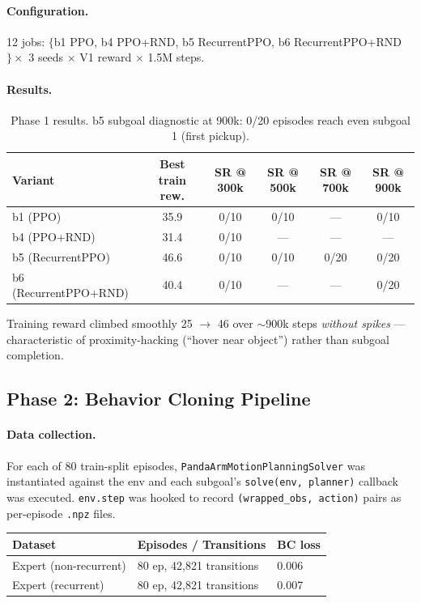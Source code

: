 \documentclass[11pt,letterpaper]{article}
\begin{document}
\paragraph{Configuration.}
12 jobs: $\{$b1 PPO, b4 PPO+RND, b5 RecurrentPPO, b6 RecurrentPPO+RND$\}
\times$ 3 seeds $\times$ V1 reward $\times$ 1.5M steps.

\paragraph{Results.}

\begin{table}[H]
\centering
\begin{tabular}{lccccc}
\toprule
\textbf{Variant} & \textbf{Best train rew.} & \textbf{SR @ 300k}
& \textbf{SR @ 500k} & \textbf{SR @ 700k} & \textbf{SR @ 900k} \\
\midrule
b1 (PPO) & 35.9 & 0/10 & 0/10 & — & 0/10 \\
b4 (PPO+RND) & 31.4 & 0/10 & — & — & — \\
b5 (RecurrentPPO) & 46.6 & 0/10 & 0/10 & 0/20 & 0/20 \\
b6 (RecurrentPPO+RND) & 40.4 & 0/10 & — & — & 0/20 \\
\bottomrule
\end{tabular}
\caption{Phase 1 results. b5 subgoal diagnostic at 900k: 0/20 episodes reach
even subgoal 1 (first pickup).}
\end{table}

Training reward climbed smoothly 25 $\to$ 46 over $\sim$900k steps \emph{without
spikes} — characteristic of proximity-hacking (``hover near object'') rather
than subgoal completion.

\subsection{Phase 2: Behavior Cloning Pipeline}

\paragraph{Data collection.}
For each of 80 train-split episodes, \texttt{PandaArmMotionPlanningSolver} was
instantiated against the env and each subgoal's \texttt{solve(env, planner)}
callback was executed. \texttt{env.step} was hooked to record
\texttt{(wrapped\_obs, action)} pairs as per-episode \texttt{.npz} files.

\begin{table}[H]
\centering
\begin{tabular}{lll}
\toprule
\textbf{Dataset} & \textbf{Episodes / Transitions} & \textbf{BC loss} \\
\midrule
Expert (non-recurrent) & 80 ep, 42{,}821 transitions & 0.006 \\
Expert (recurrent) & 80 ep, 42{,}821 transitions & 0.007 \\
\bottomrule
\end{tabular}
\end{table}
\end{document}
